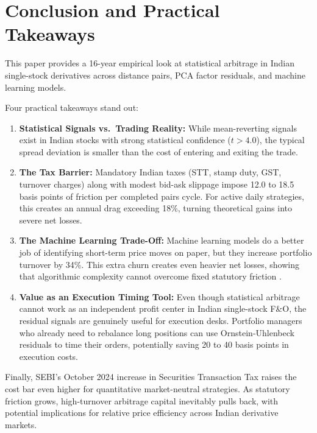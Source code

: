 \section{Conclusion and Practical Takeaways}
\label{sec:conclusion}

This paper provides a 16-year empirical look at statistical arbitrage in Indian single-stock derivatives across distance pairs, PCA factor residuals, and machine learning models.

Four practical takeaways stand out:
\begin{enumerate}
    \item \textbf{Statistical Signals vs.\ Trading Reality:} While mean-reverting signals exist in Indian stocks with strong statistical confidence ($t > 4.0$), the typical spread deviation is smaller than the cost of entering and exiting the trade.
    \item \textbf{The Tax Barrier:} Mandatory Indian taxes (STT, stamp duty, GST, turnover charges) along with modest bid-ask slippage impose 12.0 to 18.5 basis points of friction per completed pairs cycle. For active daily strategies, this creates an annual drag exceeding 18\%, turning theoretical gains into severe net losses.
    \item \textbf{The Machine Learning Trade-Off:} Machine learning models do a better job of identifying short-term price moves on paper, but they increase portfolio turnover by 34\%. This extra churn creates even heavier net losses, showing that algorithmic complexity cannot overcome fixed statutory friction \citep{novymarx2016taxonomy}.
    \item \textbf{Value as an Execution Timing Tool:} Even though statistical arbitrage cannot work as an independent profit center in Indian single-stock F\&O, the residual signals are genuinely useful for execution desks. Portfolio managers who already need to rebalance long positions can use Ornstein-Uhlenbeck residuals to time their orders, potentially saving 20 to 40 basis points in execution costs.
\end{enumerate}

Finally, SEBI's October 2024 increase in Securities Transaction Tax raises the cost bar even higher for quantitative market-neutral strategies. As statutory friction grows, high-turnover arbitrage capital inevitably pulls back, with potential implications for relative price efficiency across Indian derivative markets.


